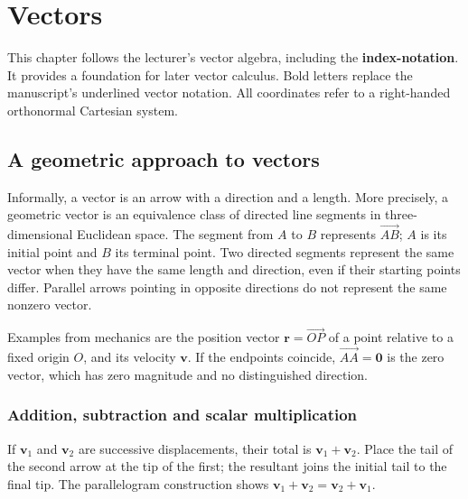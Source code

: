 \chapter{Vectors}\label{chap:vectors}

This chapter follows the lecturer's vector algebra, including the \textbf{index-notation}. 
It provides a foundation for later vector
calculus. Bold letters replace the manuscript's underlined vector notation.
All coordinates refer to a right-handed orthonormal Cartesian system.

\section{A geometric approach to vectors}

Informally, a vector is an arrow with a direction and a length. More precisely,
a geometric vector is an equivalence class of directed line segments in
three-dimensional Euclidean space. The segment from $A$ to $B$ represents
$\overrightarrow{AB}$; $A$ is its initial point and $B$ its terminal point.
Two directed segments represent the same vector when they have the same length
and direction, even if their starting points differ. Parallel arrows pointing
in opposite directions do not represent the same nonzero vector.

Examples from mechanics are the position vector $\mathbf r=\overrightarrow{OP}$
of a point relative to a fixed origin $O$, and its velocity $\mathbf v$.
If the endpoints coincide, $\overrightarrow{AA}=\mathbf0$ is the zero vector,
which has zero magnitude and no distinguished direction.

\subsection{Addition, subtraction and scalar multiplication}
If $\mathbf v_1$ and $\mathbf v_2$ are successive displacements, their total
is $\mathbf v_1+\mathbf v_2$. Place the tail of the second arrow at the tip
of the first; the resultant joins the initial tail to the final tip.
The parallelogram construction shows
$\mathbf v_1+\mathbf v_2=\mathbf v_2+\mathbf v_1$.

\begin{center}
\end{center}

